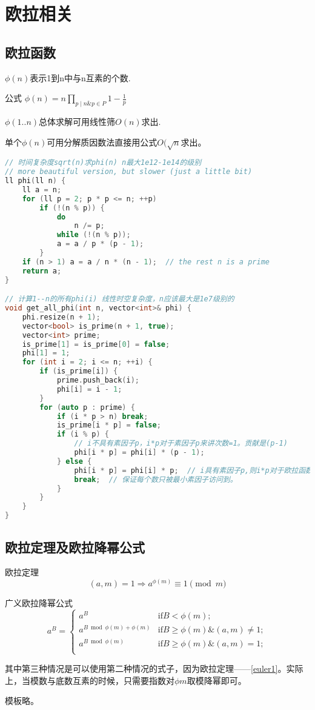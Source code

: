\section{欧拉相关}

\subsection{欧拉函数}
	\par $\phi(n)$表示1到n中与n互素的个数.
	\par 公式 $\phi(n)=n\prod\limits_{p \mid n \& p \in P } 1-\frac{1}{p}$
	\par $\phi(1..n)$总体求解可用线性筛$O(n)$求出.
	\par 单个$\phi(n)$可用分解质因数法直接用公式$O(\sqrt{n}$求出。
	
\begin{lstlisting}[language={c++}]
// 时间复杂度sqrt(n)求phi(n) n最大1e12-1e14的级别
// more beautiful version, but slower (just a little bit)
ll phi(ll n) {
	ll a = n;
	for (ll p = 2; p * p <= n; ++p)
		if (!(n % p)) {
			do
				n /= p;
			while (!(n % p));
			a = a / p * (p - 1);
		}
	if (n > 1) a = a / n * (n - 1);  // the rest n is a prime
	return a;
}

// 计算1--n的所有phi(i) 线性时空复杂度，n应该最大是1e7级别的
void get_all_phi(int n, vector<int>& phi) {
	phi.resize(n + 1);
	vector<bool> is_prime(n + 1, true);
	vector<int> prime;
	is_prime[1] = is_prime[0] = false;
	phi[1] = 1;
	for (int i = 2; i <= n; ++i) {
		if (is_prime[i]) {
			prime.push_back(i);
			phi[i] = i - 1;
		}
		for (auto p : prime) {
			if (i * p > n) break;
			is_prime[i * p] = false;
			if (i % p) {
				// i不具有素因子p，i*p对于素因子p来讲次数=1。贡献是(p-1)
				phi[i * p] = phi[i] * (p - 1);
			} else {
				phi[i * p] = phi[i] * p;  // i具有素因子p,则i*p对于欧拉函数值来讲乘以p
				break;  // 保证每个数只被最小素因子访问到。
			}
		}
	}
}
\end{lstlisting}


\subsection{欧拉定理及欧拉降幂公式}
\large{欧拉定理} $$(a,m)=1 \Rightarrow a^{\phi(m)} \equiv 1 \pmod{m} \label{euler1}$$
\par \large{广义欧拉降幂公式}
\begin{equation*}
	a^{B} = 
	\begin{cases}
		a^B                           &\text{if} B < \phi(m);\\
		a^{B \bmod \phi(m) + \phi(m)} &\text{if} B \geq \phi(m) \& (a,m) \neq 1;\\
		a^{B \bmod \phi(m)} &\text{if} B \geq \phi(m) \& (a,m) = 1;\\
	\end{cases}
\end{equation*}
\par 其中第三种情况是可以使用第二种情况的式子，因为欧拉定理——\ref{euler1}。实际上，当模数与底数互素的时候，只需要指数对$\phi{m}$取模降幂即可。
\par 模板略。